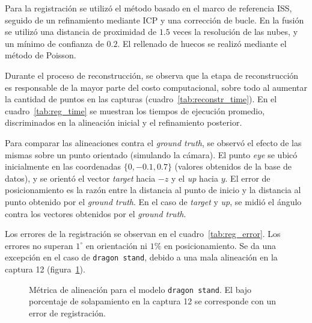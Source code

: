 		Para la registración se utilizó el método basado en el marco de referencia ISS, seguido de
		un refinamiento mediante ICP y una corrección de bucle.
		En la fusión se utilizó una distancia de proximidad de $1.5$ veces la resolución de las nubes,
		y un mínimo de confianza de $0.2$.
		El rellenado de huecos se realizó mediante el método de Poisson.


		Durante el proceso de reconstrucción, se observa que la etapa de reconstrucción
		es responsable de la mayor parte del costo computacional, sobre todo al aumentar
		la cantidad de puntos en las capturas (cuadro~\ref{tab:reconstr_time}).
		En el cuadro~\ref{tab:reg_time} se muestran
		los tiempos de ejecución promedio, discriminados en la alineación
		inicial y el refinamiento posterior.
		

		

		Para comparar las alineaciones contra el \emph{ground truth}, se
		observó el efecto de las mismas sobre un punto orientado (simulando la
		cámara). El punto \emph{eye} se ubicó inicialmente en las coordenadas
		$\{0, -0.1, 0.7\}$ (valores obtenidos de la base de datos), y se
		orientó el vector \emph{target} hacia $-z$ y el \emph{up} hacia $y$.
		El error de posicionamiento es la razón entre la distancia al punto
		de inicio y la distancia al punto obtenido por el \emph{ground truth}.
		En el caso de \emph{target} y \emph{up}, se midió el ángulo contra los
		vectores obtenidos por el \emph{ground truth}.

		Los errores de la registración se observan en el
		cuadro~\ref{tab:reg_error}.  Los errores no superan $1^{\circ}$ en
		orientación ni $1\%$ en posicionamiento.  Se da una excepción en el
		caso de \texttt{dragon stand}, debido a una mala alineación en la
		captura 12 (figura~\ref{fig:fitness}).

		

		\begin{figure}
			\center
				\resizebox{\linewidth}{!}{}
			\caption{\label{fig:fitness}Métrica de alineación para el modelo \texttt{dragon stand}. El bajo
			porcentaje de solapamiento en la captura 12 se corresponde
			con un error de registración.}
		\end{figure}



